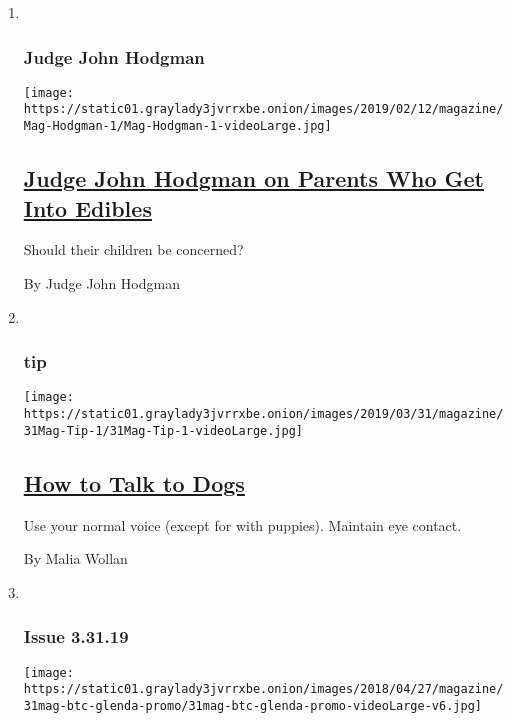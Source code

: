 \begin{enumerate}
\def\labelenumi{\arabic{enumi}.}
\item ~
  \hypertarget{judge-john-hodgman}{%
  \subsubsection{Judge John Hodgman}\label{judge-john-hodgman}}

  \texttt{[image: https://static01.graylady3jvrrxbe.onion/images/2019/02/12/magazine/Mag-Hodgman-1/Mag-Hodgman-1-videoLarge.jpg]}

  \hypertarget{judge-john-hodgman-on-parents-who-get-into-edibles}{%
  \subsection{\texorpdfstring{\href{/2019/03/28/magazine/judge-john-hodgman-parents-marijuana-edibles.html}{Judge
  John Hodgman on Parents Who Get Into
  Edibles}}{Judge John Hodgman on Parents Who Get Into Edibles}}\label{judge-john-hodgman-on-parents-who-get-into-edibles}}

  Should their children be concerned?

  By Judge John Hodgman
\item ~
  \hypertarget{tip}{%
  \subsubsection{tip}\label{tip}}

  \texttt{[image: https://static01.graylady3jvrrxbe.onion/images/2019/03/31/magazine/31Mag-Tip-1/31Mag-Tip-1-videoLarge.jpg]}

  \hypertarget{how-to-talk-to-dogs}{%
  \subsection{\texorpdfstring{\href{/2019/03/26/magazine/how-to-talk-to-dogs.html}{How
  to Talk to Dogs}}{How to Talk to Dogs}}\label{how-to-talk-to-dogs}}

  Use your normal voice (except for with puppies). Maintain eye contact.

  By Malia Wollan
\item ~
  \hypertarget{issue-33119}{%
  \subsubsection{Issue 3.31.19}\label{issue-33119}}

  \texttt{[image: https://static01.graylady3jvrrxbe.onion/images/2018/04/27/magazine/31mag-btc-glenda-promo/31mag-btc-glenda-promo-videoLarge-v6.jpg]}


\end{enumerate}
